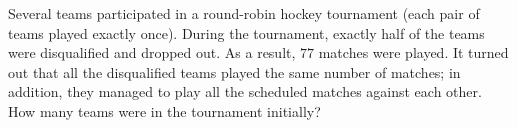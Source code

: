 Several teams participated in a round-robin hockey tournament (each pair of teams played exactly once). During the tournament, exactly half of the teams were disqualified and dropped out. As a result, $77$ matches were played. It turned out that all the disqualified teams played the same number of matches; in addition, they managed to play all the scheduled matches against each other. How many teams were in the tournament initially?
